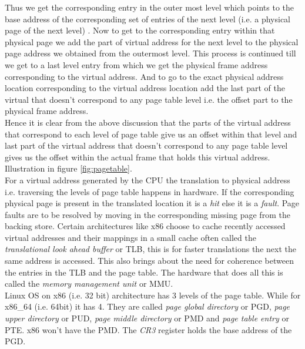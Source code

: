 Thus we get the corresponding entry in the outer most level which points to the base address of
the corresponding set of entries of the next level (i.e. a physical page of the next level) . Now
to get to the corresponding entry within that physical page we add the part of virtual address for
the next level to the physical page address we obtained from the outermost level. This process is
continued till we get to a last level entry from which we get the physical frame address 
corresponding to the virtual address. And to go to the exact physical address location
corresponding to the virtual address location add the last part of the virtual that doesn't
correspond to any page table level i.e. the offset part to the physical frame address.\\    
Hence it is clear from the above discussion that the parts of the virtual address that correspond
to each level of page table give us an offset within that level and last part of the virtual
address that doesn't correspond to any page table level gives us the offset within the actual
frame that holds this virtual address. Illustration in figure \ref{fig:pagetable}.\\
For a virtual address generated by the CPU the translation to physical address i.e. traversing the
levels of page table happens in hardware. If the corresponding physical page is present in the
translated location it is a \textit{hit} else it is a \textit{fault}. Page faults are to be
resolved by moving in the corresponding missing page from the backing store. Certain architectures
like x86 choose to cache recently accessed virtual addresses and their mappings in a small cache
often called the \textit{translational look ahead buffer} or TLB, this is for faster translations
the next the same address is accessed. This also brings about the need for coherence between the
entries in the TLB and the page table. The hardware that does all this is called the
\textit{memory management unit} or MMU.\\
Linux OS on x86 (i.e. 32 bit) architecture has 3 levels of the page table. While for x86\_64 (i.e.
64bit) it has 4. They are called \textit{page global directory} or PGD, \textit{page upper
directory} or PUD, \textit{page middle directory} or PMD and \textit{page table entry} or PTE. x86
won't have the PMD. The \textit{CR3} register holds the base address of the PGD.\\


